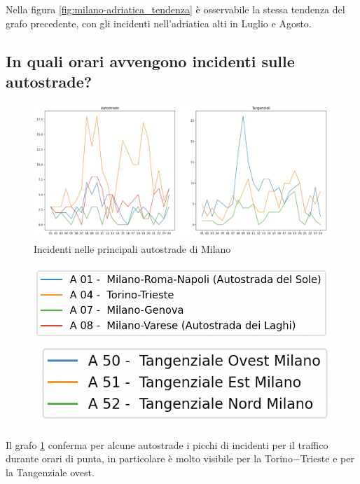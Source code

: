 \documentclass[a4paper]{report}
\begin{document}
Nella figura \ref{fig:milano-adriatica_tendenza} è osservabile la stessa tendenza del grafo precedente, 
con gli incidenti nell'adriatica alti in Luglio e Agosto. 

\subsection{In quali orari avvengono incidenti sulle autostrade?}

\begin{figure}
    \includegraphics[width=\linewidth]{../src/incidenti/incidenti_aci/autostrade/tangenziali_autostrade.png}
    \caption{Incidenti nelle principali autostrade di Milano}
    \label{fig:tangenziali-autostrade}
\end{figure}

\begin{figure}
    \includegraphics[width=0.6\linewidth]{../src/incidenti/incidenti_aci/autostrade/legenda_autostrade.png}
    \includegraphics[width=0.45\linewidth]{../src/incidenti/incidenti_aci/autostrade/legenda_tangenziali.png}
\end{figure}

Il grafo \ref{fig:tangenziali-autostrade} conferma per alcune autostrade i picchi di 
incidenti per il traffico durante orari di punta, 
in particolare è molto visibile per la Torino$-$Trieste e per la Tangenziale ovest.

\end{document}
